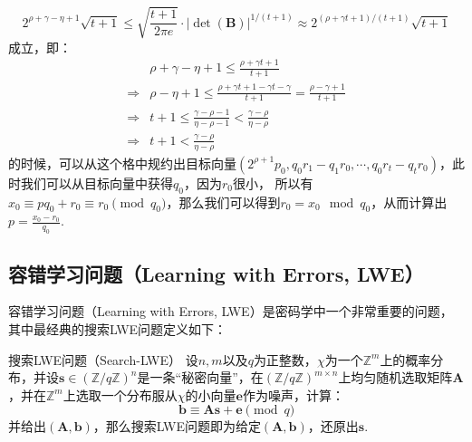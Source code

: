 \documentclass{book}
\numberwithin{equation}{subsubsection}
\begin{document}
\begin{equation}
    2^{\rho+\gamma-\eta+1}\sqrt{t+1}\le\sqrt{\frac{t+1}{2\pi e}}\cdot|\det(\pmb{B})|^{1/(t+1)}\approx2^{(\rho+\gamma t+1)/(t+1)}\sqrt{t+1}
    \nonumber
\end{equation}
成立，即：
\begin{equation}
    \begin{aligned}
        &\rho+\gamma-\eta+1\le \frac{\rho+\gamma t+1}{t+1}\\
        \Rightarrow&\rho-\eta+1\le\frac{\rho+\gamma t+1-\gamma t-\gamma}{t+1}=\frac{\rho-\gamma+1}{t+1}\\
        \Rightarrow&t+1\le\frac{\gamma-\rho-1}{\eta-\rho-1}<\frac{\gamma-\rho}{\eta-\rho}\\
        \Rightarrow&t+1<\frac{\gamma-\rho}{\eta-\rho}
    \end{aligned}
    \nonumber
\end{equation}
的时候，可以从这个格中规约出目标向量$(2^{\rho+1}p_0,q_0r_1-q_1r_0,\cdots,q_0r_t-q_tr_0)$，此时我们可以从目标向量中获得$q_0$，因为$r_0$很小，
所以有$x_0\equiv pq_0+r_0\equiv r_0\pmod{q_0}$，那么我们可以得到$r_0=x_0\mod{q_0}$，从而计算出$p=\frac{x_0-r_0}{q_0}$.

\subsection{容错学习问题（Learning with Errors, LWE）}
容错学习问题（Learning with Errors, LWE）是密码学中一个非常重要的问题，其中最经典的搜索LWE问题定义如下：

\begin{concept}{搜索LWE问题（Search-LWE）}
    设$n,m$以及$q$为正整数，$\chi$为一个$\mathbb{Z}^{m}$上的概率分布，并设$\pmb{s}\in(\mathbb{Z}/q\mathbb{Z})^n$是一条“秘密向量”，在$(\mathbb{Z}/q\mathbb{Z})^{m\times n}$上均匀随机选取矩阵$\pmb{A}$，并在$\mathbb{Z}^m$上选取一个分布服从$\chi$的小向量$\pmb{e}$作为噪声，计算：
    \begin{equation}
        \pmb{b}\equiv \pmb{A}\pmb{s}+\pmb{e}\pmod{q}
        \nonumber
    \end{equation}
    并给出$(\pmb{A},\pmb{b})$，那么搜索LWE问题即为给定$(\pmb{A},\pmb{b})$，还原出$\pmb{s}$.
\end{concept}
\end{document}
